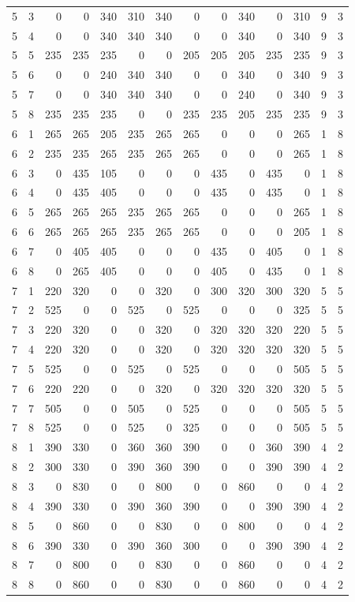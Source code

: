{\begin{longtable}{cc*{10}{r}cc}
5 & 3 & 0 & 0 & 340 & 310 & 340 & 0 & 0 & 340 & 0 & 310 & 9 & 3 \\
5 & 4 & 0 & 0 & 340 & 340 & 340 & 0 & 0 & 340 & 0 & 340 & 9 & 3 \\
5 & 5 & 235 & 235 & 235 & 0 & 0 & 205 & 205 & 205 & 235 & 235 & 9 & 3 \\
5 & 6 & 0 & 0 & 240 & 340 & 340 & 0 & 0 & 340 & 0 & 340 & 9 & 3 \\
5 & 7 & 0 & 0 & 340 & 340 & 340 & 0 & 0 & 240 & 0 & 340 & 9 & 3 \\
5 & 8 & 235 & 235 & 235 & 0 & 0 & 235 & 235 & 205 & 235 & 235 & 9 & 3 \\\midrule
6 & 1 & 265 & 265 & 205 & 235 & 265 & 265 & 0 & 0 & 0 & 265 & 1 & 8 \\
6 & 2 & 235 & 235 & 265 & 235 & 265 & 265 & 0 & 0 & 0 & 265 & 1 & 8 \\
6 & 3 & 0 & 435 & 105 & 0 & 0 & 0 & 435 & 0 & 435 & 0 & 1 & 8 \\
6 & 4 & 0 & 435 & 405 & 0 & 0 & 0 & 435 & 0 & 435 & 0 & 1 & 8 \\
6 & 5 & 265 & 265 & 265 & 235 & 265 & 265 & 0 & 0 & 0 & 265 & 1 & 8 \\
6 & 6 & 265 & 265 & 265 & 235 & 265 & 265 & 0 & 0 & 0 & 205 & 1 & 8 \\
6 & 7 & 0 & 405 & 405 & 0 & 0 & 0 & 435 & 0 & 405 & 0 & 1 & 8 \\
6 & 8 & 0 & 265 & 405 & 0 & 0 & 0 & 405 & 0 & 435 & 0 & 1 & 8 \\\midrule
7 & 1 & 220 & 320 & 0 & 0 & 320 & 0 & 300 & 320 & 300 & 320 & 5 & 5 \\
7 & 2 & 525 & 0 & 0 & 525 & 0 & 525 & 0 & 0 & 0 & 325 & 5 & 5 \\
7 & 3 & 220 & 320 & 0 & 0 & 320 & 0 & 320 & 320 & 320 & 220 & 5 & 5 \\
7 & 4 & 220 & 320 & 0 & 0 & 320 & 0 & 320 & 320 & 320 & 320 & 5 & 5 \\
7 & 5 & 525 & 0 & 0 & 525 & 0 & 525 & 0 & 0 & 0 & 505 & 5 & 5 \\
7 & 6 & 220 & 220 & 0 & 0 & 320 & 0 & 320 & 320 & 320 & 320 & 5 & 5 \\
7 & 7 & 505 & 0 & 0 & 505 & 0 & 525 & 0 & 0 & 0 & 505 & 5 & 5 \\
7 & 8 & 525 & 0 & 0 & 525 & 0 & 325 & 0 & 0 & 0 & 505 & 5 & 5 \\\midrule
8 & 1 & 390 & 330 & 0 & 360 & 360 & 390 & 0 & 0 & 360 & 390 & 4 & 2 \\
8 & 2 & 300 & 330 & 0 & 390 & 360 & 390 & 0 & 0 & 390 & 390 & 4 & 2 \\
8 & 3 & 0 & 830 & 0 & 0 & 800 & 0 & 0 & 860 & 0 & 0 & 4 & 2 \\
8 & 4 & 390 & 330 & 0 & 390 & 360 & 390 & 0 & 0 & 390 & 390 & 4 & 2 \\
8 & 5 & 0 & 860 & 0 & 0 & 830 & 0 & 0 & 800 & 0 & 0 & 4 & 2 \\
8 & 6 & 390 & 330 & 0 & 390 & 360 & 300 & 0 & 0 & 390 & 390 & 4 & 2 \\
8 & 7 & 0 & 800 & 0 & 0 & 830 & 0 & 0 & 860 & 0 & 0 & 4 & 2 \\
8 & 8 & 0 & 860 & 0 & 0 & 830 & 0 & 0 & 860 & 0 & 0 & 4 & 2 \\
\bottomrule
\end{longtable}
}
